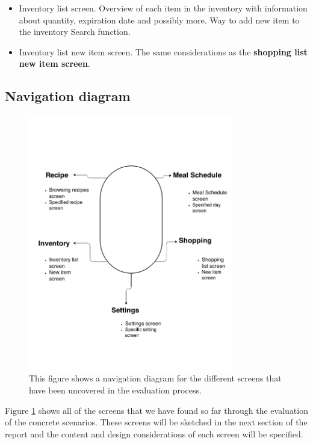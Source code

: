 \begin{itemize}
	\item Inventory list screen.
		\subitem Overview of each item in the inventory with information about quantity, expiration date and possibly more.
		\subitem Way to add new item to the inventory
		\subitem Search function.
	\item Inventory list new item screen.
		\subitem The same considerations as the \textbf{shopping list new item screen}.
\end{itemize}

\subsection{Navigation diagram}


\begin{figure}[H]
	\includegraphics[width=0.8\textwidth]{Grafik/FoodPlanner/NavigationsDiagram}
	\caption{This figure shows a navigation diagram for the different screens that have been uncovered in the evaluation process.}
	\label{NavigationDiagram}
\end{figure}

Figure \cref{NavigationDiagram} shows all of the screens that we have found so far through the evaluation of the concrete scenarios. These screens will be sketched in the next section of the report and the content and design considerations of each screen will be specified.  
